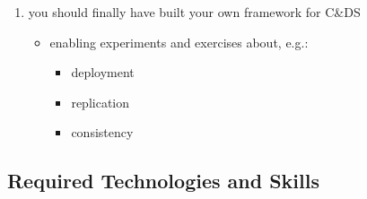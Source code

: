 \documentclass[presentation]{beamer}\mode<presentation>{\usetheme{AMSCesenaPurpleAndGold}}
\begin{document}
\begin{frame}[allowframebreaks]
\begin{enumerate}
		\medskip

		\item you should finally have built your own framework for C\&DS
		\begin{itemize}
			\item enabling experiments and exercises about, e.g.:
			\begin{itemize}
				\item deployment
				\item replication
				\item consistency
			\end{itemize}
		\end{itemize}

	\end{enumerate}

\end{frame}

\subsection{Required Technologies and Skills}
\end{document}
